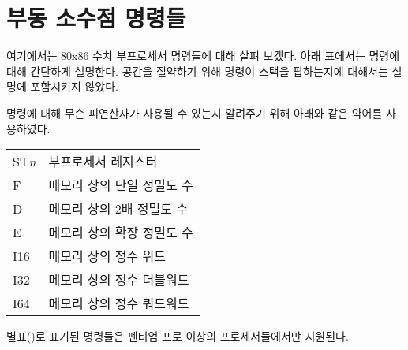 \newpage
\section{부동 소수점 명령들}

\renewcommand{\thefootnote}{\fnsymbol{footnote}} 여기에서는
80x86 수치 부프로세서 명령들에 대해 살펴 보겠다. 아래 표에서는 명령에 대해
간단하게 설명한다. 공간을 절약하기 위해 명령이 스택을 팝하는지에 대해서는
설명에 포함시키지 않았다.

명령에 대해 무슨 피연산자가 사용될 수 있는지 알려주기 위해 아래와 같은
약어를 사용하였다. 

\begin{center}
\begin{tabular}{|l|l|}
\hline
ST\emph{n} & 부프로세서 레지스터 \\
F          & 메모리 상의 단일 정밀도 수 \\
D          & 메모리 상의 2배 정밀도 수 \\
E          & 메모리 상의 확장 정밀도 수 \\
I16        & 메모리 상의 정수 워드 \\
I32        & 메모리 상의 정수 더블워드 \\
I64        & 메모리 상의 정수 쿼드워드 \\
\hline
\end{tabular}
\end{center}

별표(\footnotemark[1])로 표기된 명령들은 펜티엄 프로 이상의 프로세서들에서만
지원된다. 

